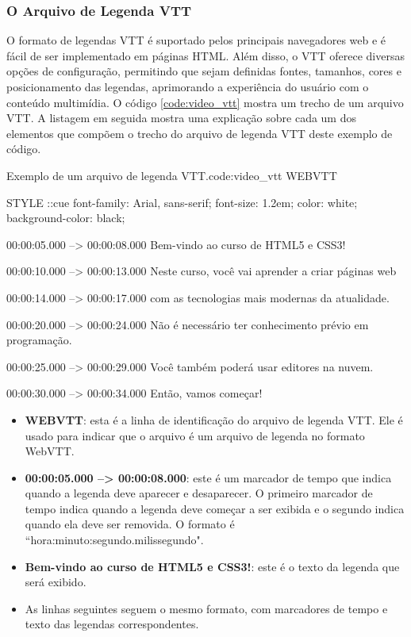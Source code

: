 \subsubsection{O Arquivo de Legenda VTT}

O formato de legendas VTT é suportado pelos principais navegadores web e é fácil de ser implementado em páginas HTML. Além disso, o VTT oferece diversas opções de configuração, permitindo que sejam definidas fontes, tamanhos, cores e posicionamento das legendas, aprimorando a experiência do usuário com o conteúdo multimídia. O código \ref{code:video_vtt} mostra um trecho de um arquivo VTT. A listagem em seguida mostra uma explicação sobre cada um dos elementos que compõem o trecho do arquivo de legenda VTT deste exemplo de código.

\begin{htmlcode}{Exemplo de um arquivo de legenda VTT.}{code:video_vtt}
WEBVTT

STYLE
::cue {
  font-family: Arial, sans-serif;
  font-size: 1.2em;
  color: white;
  background-color: black;
}

00:00:05.000 --> 00:00:08.000
Bem-vindo ao curso de HTML5 e CSS3!

00:00:10.000 --> 00:00:13.000
Neste curso, você vai aprender a criar páginas web

00:00:14.000 --> 00:00:17.000
com as tecnologias mais modernas da atualidade.

00:00:20.000 --> 00:00:24.000
Não é necessário ter conhecimento prévio em programação.

00:00:25.000 --> 00:00:29.000
Você também poderá usar editores na nuvem.

00:00:30.000 --> 00:00:34.000
Então, vamos começar!
\end{htmlcode}

\begin{itemize}
    \item \textbf{WEBVTT}: esta é a linha de identificação do arquivo de legenda VTT. Ele é usado para indicar que o arquivo é um arquivo de legenda no formato WebVTT.
    \item \textbf{00:00:05.000 --> 00:00:08.000}: este é um marcador de tempo que indica quando a legenda deve aparecer e desaparecer. O primeiro marcador de tempo indica quando a legenda deve começar a ser exibida e o segundo indica quando ela deve ser removida. O formato é ``hora:minuto:segundo.milissegundo".
    \item \textbf{Bem-vindo ao curso de HTML5 e CSS3!}: este é o texto da legenda que será exibido.
    \item As linhas seguintes seguem o mesmo formato, com marcadores de tempo e texto das legendas correspondentes.
\end{itemize}

